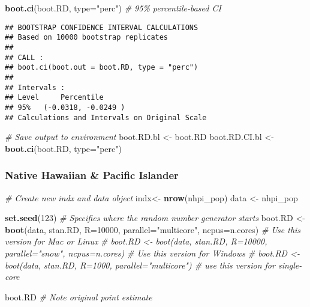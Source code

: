 \documentclass[
]{article}
\newenvironment{Shaded}{\begin{snugshade}}{\end{snugshade}}
\newcommand{\AttributeTok}[1]{\textcolor[rgb]{0.13,0.29,0.53}{#1}}
\newcommand{\CommentTok}[1]{\textcolor[rgb]{0.56,0.35,0.01}{\textit{#1}}}
\newcommand{\DecValTok}[1]{\textcolor[rgb]{0.00,0.00,0.81}{#1}}
\newcommand{\FunctionTok}[1]{\textcolor[rgb]{0.13,0.29,0.53}{\textbf{#1}}}
\newcommand{\NormalTok}[1]{#1}
\newcommand{\OtherTok}[1]{\textcolor[rgb]{0.56,0.35,0.01}{#1}}
\newcommand{\StringTok}[1]{\textcolor[rgb]{0.31,0.60,0.02}{#1}}
\begin{document}
\begin{Shaded}
\begin{Highlighting}[]
\FunctionTok{boot.ci}\NormalTok{(boot.RD, }\AttributeTok{type=}\StringTok{"perc"}\NormalTok{) }\CommentTok{\# 95\% percentile{-}based CI}
\end{Highlighting}
\end{Shaded}

\begin{verbatim}
## BOOTSTRAP CONFIDENCE INTERVAL CALCULATIONS
## Based on 10000 bootstrap replicates
## 
## CALL : 
## boot.ci(boot.out = boot.RD, type = "perc")
## 
## Intervals : 
## Level     Percentile     
## 95%   (-0.0318, -0.0249 )  
## Calculations and Intervals on Original Scale
\end{verbatim}

\begin{Shaded}
\begin{Highlighting}[]
\CommentTok{\# Save output to environment}
\NormalTok{boot.RD.bl }\OtherTok{\textless{}{-}}\NormalTok{ boot.RD}
\NormalTok{boot.RD.CI.bl }\OtherTok{\textless{}{-}} \FunctionTok{boot.ci}\NormalTok{(boot.RD, }\AttributeTok{type=}\StringTok{"perc"}\NormalTok{) }
\end{Highlighting}
\end{Shaded}

\subsubsection{Native Hawaiian \& Pacific
Islander}\label{native-hawaiian-pacific-islander}

\begin{Shaded}
\begin{Highlighting}[]
\CommentTok{\# Create new indx and data object }
\NormalTok{indx}\OtherTok{\textless{}{-}} \FunctionTok{nrow}\NormalTok{(nhpi\_pop)}
\NormalTok{data }\OtherTok{\textless{}{-}}\NormalTok{ nhpi\_pop}

\FunctionTok{set.seed}\NormalTok{(}\DecValTok{123}\NormalTok{) }\CommentTok{\# Specifies where the random number generator starts}
\NormalTok{boot.RD }\OtherTok{\textless{}{-}} \FunctionTok{boot}\NormalTok{(data, stan.RD, }\AttributeTok{R=}\DecValTok{10000}\NormalTok{, }\AttributeTok{parallel=}\StringTok{"multicore"}\NormalTok{, }\AttributeTok{ncpus=}\NormalTok{n.cores) }\CommentTok{\# Use this version for Mac or Linux}
\CommentTok{\# boot.RD \textless{}{-} boot(data, stan.RD, R=10000, parallel="snow", ncpus=n.cores) \# Use this version for Windows}
\CommentTok{\# boot.RD \textless{}{-} boot(data, stan.RD, R=1000, parallel="multicore") \# use this version for single{-}core}

\NormalTok{boot.RD }\CommentTok{\# Note original point estimate}
\end{Highlighting}
\end{Shaded}
\end{document}

